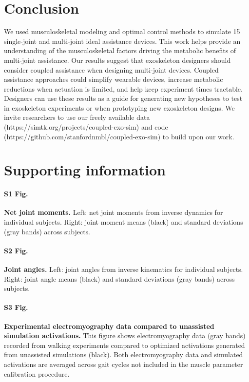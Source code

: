 \documentclass[10pt,letterpaper]{article}
\begin{document}
\section*{Conclusion}
We used musculoskeletal modeling and optimal control methods to simulate 15 single-joint and multi-joint ideal assistance devices. This work helps provide an understanding of the musculoskeletal factors driving the metabolic benefits of multi-joint assistance. Our results suggest that exoskeleton designers should consider coupled assistance when designing multi-joint devices. Coupled assistance approaches could simplify wearable devices, increase metabolic reductions when actuation is limited, and help keep experiment times tractable. Designers can use these results as a guide for generating new hypotheses to test in exoskeleton experiments or when prototyping new exoskeleton designs. We invite researchers to use our freely available data (https://simtk.org/projects/coupled-exo-sim) and code (https://github.com/stanfordnmbl/coupled-exo-sim) to build upon our work.

\section*{Supporting information}

\paragraph*{S1 Fig.}
\label{S1_Fig}
{\bf Net joint moments.} Left: net joint moments from inverse dynamics for individual subjects. Right: joint moment means (black) and standard deviations (gray bands) across subjects.

\paragraph*{S2 Fig.}
\label{S2_Fig}
{\bf Joint angles.} Left: joint angles from inverse kinematics for individual subjects. Right: joint angle means (black) and standard deviations (gray bands) across subjects.

\paragraph*{S3 Fig.}
\label{S3_Fig}
{\bf Experimental electromyography data compared to unassisted simulation activations.} This figure shows electromyography data (gray bands) recorded from walking experiments compared to optimized activations generated from unassisted simulations (black). Both electromyography data and simulated activations are averaged across gait cycles not included in the muscle parameter calibration procedure.
\end{document}
